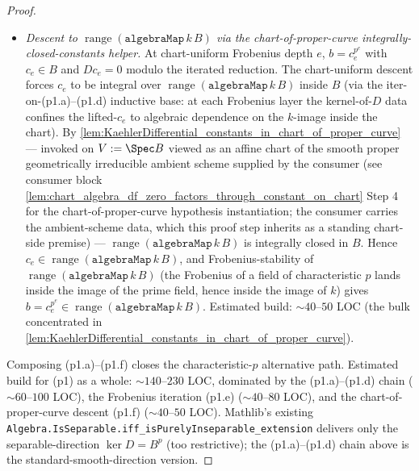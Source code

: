 \begin{proof}
\begin{itemize}
    \item[(p1.f)] \emph{Descent to \(\operatorname{range}(\mathtt{algebraMap}\,k\,B)\) via the chart-of-proper-curve integrally-closed-constants helper.} At chart-uniform Frobenius depth \(e\), \(b = c_e^{p^e}\) with \(c_e \in B\) and \(D c_e = 0\) modulo the iterated reduction. The chart-uniform descent forces \(c_e\) to be integral over \(\operatorname{range}(\mathtt{algebraMap}\,k\,B)\) inside \(B\) (via the iter-on-(p1.a)--(p1.d) inductive base: at each Frobenius layer the kernel-of-\(D\) data confines the lifted-\(c_e\) to algebraic dependence on the \(k\)-image inside the chart). By \cref{lem:KaehlerDifferential_constants_in_chart_of_proper_curve} --- invoked on \(V := \Spec B\) viewed as an affine chart of the smooth proper geometrically irreducible ambient scheme supplied by the consumer (see consumer block \cref{lem:chart_algebra_df_zero_factors_through_constant_on_chart} Step 4 for the chart-of-proper-curve hypothesis instantiation; the consumer carries the ambient-scheme data, which this proof step inherits as a standing chart-side premise) --- \(\operatorname{range}(\mathtt{algebraMap}\,k\,B)\) is integrally closed in \(B\). Hence \(c_e \in \operatorname{range}(\mathtt{algebraMap}\,k\,B)\), and Frobenius-stability of \(\operatorname{range}(\mathtt{algebraMap}\,k\,B)\) (the Frobenius of a field of characteristic \(p\) lands inside the image of the prime field, hence inside the image of \(k\)) gives \(b = c_e^{p^e} \in \operatorname{range}(\mathtt{algebraMap}\,k\,B)\). Estimated build: \(\sim 40\)--\(50\) LOC (the bulk concentrated in \cref{lem:KaehlerDifferential_constants_in_chart_of_proper_curve}).
  \end{itemize}
  Composing (p1.a)--(p1.f) closes the characteristic-\(p\) alternative path. Estimated build for (p1) as a whole: \(\sim 140\)--\(230\) LOC, dominated by the (p1.a)--(p1.d) chain (\(\sim 60\)--\(100\) LOC), the Frobenius iteration (p1.e) (\(\sim 40\)--\(80\) LOC), and the chart-of-proper-curve descent (p1.f) (\(\sim 40\)--\(50\) LOC). Mathlib's existing \texttt{Algebra.IsSeparable.iff\_isPurelyInseparable\_extension} delivers only the separable-direction \(\ker D = B^p\) (too restrictive); the (p1.a)--(p1.d) chain above is the standard-smooth-direction version.


\end{proof}
